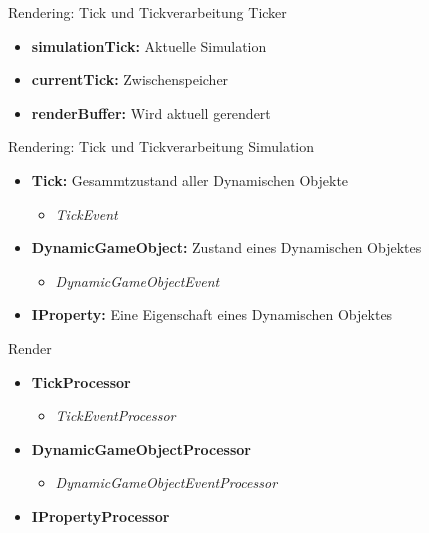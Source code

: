 \documentclass[10pt]{beamer}
\begin{document}
\begin{frame}[fragile]{Rendering: Tick und Tickverarbeitung}
    Ticker
    \begin{itemize}
        \item \textbf{simulationTick:} Aktuelle Simulation
        \item \textbf{currentTick:} Zwischenspeicher
        \item \textbf{renderBuffer:} Wird aktuell gerendert
    \end{itemize}
\end{frame}

\begin{frame}[fragile]{Rendering: Tick und Tickverarbeitung}
    Simulation
    \begin{itemize}
        \item \textbf{Tick:} Gesammtzustand aller Dynamischen Objekte
        \begin{itemize}
            \item \textit{TickEvent}
        \end{itemize}
        \item \textbf{DynamicGameObject:} Zustand eines Dynamischen Objektes
        \begin{itemize}
            \item \textit{DynamicGameObjectEvent}
        \end{itemize}
        \item \textbf{IProperty:} Eine Eigenschaft eines Dynamischen Objektes
    \end{itemize}

    \mbox{}\par
    Render
    \begin{itemize}
        \item \textbf{TickProcessor}
        \begin{itemize}
            \item \textit{TickEventProcessor}
        \end{itemize}
        \item \textbf{DynamicGameObjectProcessor}
        \begin{itemize}
            \item \textit{DynamicGameObjectEventProcessor}
        \end{itemize}
        \item \textbf{IPropertyProcessor}
    \end{itemize}
\end{frame}
\end{document}

